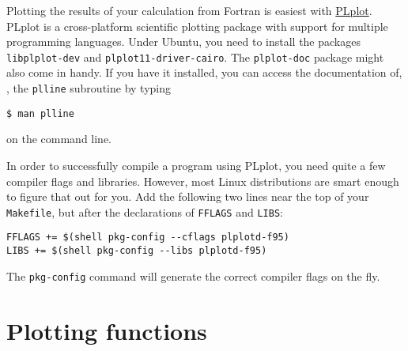 \label{chap:PLplot}

Plotting the results of your calculation from Fortran is easiest with \href{http://plplot.sourceforge.net/}{PLplot}.
PLplot is a cross-platform scientific plotting package with support for multiple programming languages.
Under Ubuntu, you need to install the packages \texttt{libplplot-dev} and \texttt{plplot11-driver-cairo}.
The \texttt{plplot-doc} package might also come in handy.
If you have it installed, you can access the documentation of, \eg, the \texttt{plline} subroutine by typing
\begin{verbatim}
$ man plline
\end{verbatim}
on the command line.

In order to successfully compile a program using PLplot, you need quite a few compiler flags and libraries.
However, most Linux distributions are smart enough to figure that out for you.
Add the following two lines near the top of your \texttt{Makefile}, but after the declarations of \texttt{FFLAGS} and \texttt{LIBS}:
\begin{verbatim}
FFLAGS += $(shell pkg-config --cflags plplotd-f95)
LIBS += $(shell pkg-config --libs plplotd-f95)
\end{verbatim}
The \texttt{pkg-config} command will generate the correct compiler flags on the fly.

\section{Plotting functions}

